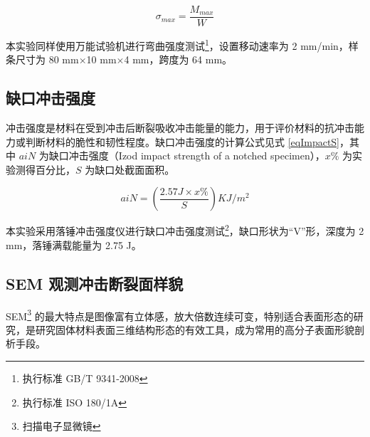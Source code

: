 \begin{equation}
    \label{eqBendS}
    \sigma_{max} = \frac{M_{max}}{W}
\end{equation}

本实验同样使用万能试验机进行弯曲强度测试\footnote{执行标准 GB/T 9341-2008}，设置移动速率为 2 mm/min，样条尺寸为 80 mm$\times$10 mm$\times$4 mm，跨度为 64 mm。

\subsection{缺口冲击强度}
冲击强度是材料在受到冲击后断裂吸收冲击能量的能力，用于评价材料的抗冲击能力或判断材料的脆性和韧性程度。缺口冲击强度的计算公式见式 \eqref{eqImpactS}，其中 $aiN$ 为缺口冲击强度（Izod impact strength of a notched specimen），$x\%$ 为实验测得百分比，$S$ 为缺口处截面面积。

\begin{equation}
    \label{eqImpactS}
    aiN = (\frac{2.57 J \times x\%}{S}) KJ/m^2
\end{equation}

本实验采用落锤冲击强度仪进行缺口冲击强度测试\footnote{执行标准 ISO 180/1A}，缺口形状为“V”形，深度为 2 mm，落锤满载能量为 2.75 J。

\subsection{SEM 观测冲击断裂面样貌}
SEM\footnote{扫描电子显微镜} 的最大特点是图像富有立体感，放大倍数连续可变，特别适合表面形态的研究，是研究固体材料表面三维结构形态的有效工具，成为常用的高分子表面形貌剖析手段。
